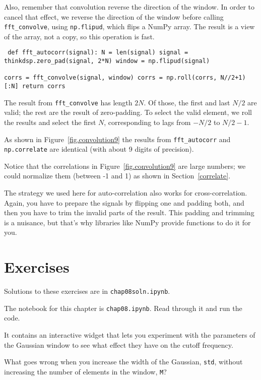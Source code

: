 \documentclass[12pt]{book} \usepackage[width=5.5in,height=8.5in, hmarginratio=3:2,vmarginratio=1:1]{geometry}
\begin{document}
Also, remember that convolution reverse the direction of the window. In order to cancel that effect, we reverse the direction of the window before calling \verb"fft_convolve", using {\tt np.flipud}, which flips a NumPy array. The result is a view of the array, not a copy, so this operation is fast. 

\begin{verbatim} def fft_autocorr(signal): N = len(signal) signal = thinkdsp.zero_pad(signal, 2*N) window = np.flipud(signal) 

corrs = fft_convolve(signal, window) corrs = np.roll(corrs, N//2+1)[:N] return corrs \end{verbatim} 

The result from \verb"fft_convolve" has length $2N$. Of those, the first and last $N/2$ are valid; the rest are the result of zero-padding. To select the valid element, we roll the results and select the first $N$, corresponding to lags from $-N/2$ to $N/2-1$. 

As shown in Figure~\ref{fig.convolution9} the results from \verb"fft_autocorr" and {\tt np.correlate} are identical (with about 9 digits of precision). 

Notice that the correlations in Figure~\ref{fig.convolution9} are large numbers; we could normalize them (between -1 and 1) as shown in Section~\ref{correlate}. 

The strategy we used here for auto-correlation also works for cross-correlation. Again, you have to prepare the signals by flipping one and padding both, and then you have to trim the invalid parts of the result. This padding and trimming is a nuisance, but that's why libraries like NumPy provide functions to do it for you. 

\section{Exercises} 

Solutions to these exercises are in {\tt chap08soln.ipynb}. 

\begin{exercise} The notebook for this chapter is {\tt chap08.ipynb}. Read through it and run the code. 

It contains an interactive widget that lets you experiment with the parameters of the Gaussian window to see what effect they have on the cutoff frequency. 

What goes wrong when you increase the width of the Gaussian, {\tt std}, without increasing the number of elements in the window, {\tt M}? \end{exercise} 
\end{document}
